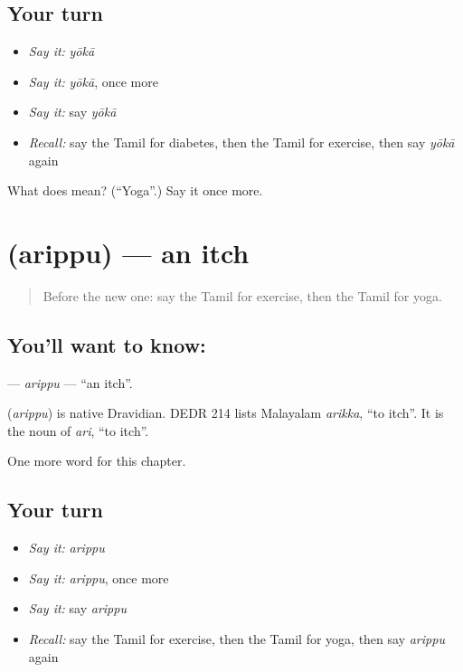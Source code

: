 \subsection*{Your turn}
\begin{itemize}
\raggedright
  \item \emph{Say it:} \emph{yōkā}
  \item \emph{Say it:} \emph{yōkā}, once more
  \item \emph{Say it:} say \emph{yōkā}
  \item \emph{Recall:} say the Tamil for diabetes, then the Tamil for exercise, then say \emph{yōkā} again
\end{itemize}

\begin{tcolorbox}[breakable,colback=teal!4,colframe=teal!35!black,title={Before you move on}]
What does  mean? (\textquotedblleft{}Yoga\textquotedblright{}.) Say it once more.
\end{tcolorbox}
\section[\texorpdfstring{\ta{அரிப்பு} (arippu)}{அரிப்பு (arippu)}]{ (arippu) — an itch}

\label{lesson:TA-C261-arippu}



\begin{quote}
Before the new one: say the Tamil for exercise, then the Tamil for yoga.
\end{quote}

\subsection*{You'll want to know: }
\textbf{} — \emph{arippu} — \textquotedblleft{}an itch\textquotedblright{}.

\begin{cousinweb}
\textbf{} (\emph{arippu}) is native Dravidian. DEDR 214 lists Malayalam \emph{arikka}, \textquotedblleft{}to itch\textquotedblright{}. It is the noun of \emph{ari}, \textquotedblleft{}to itch\textquotedblright{}.
\end{cousinweb}

\begin{grammarlens}[title={What you've built}]
One more word for this chapter.
\end{grammarlens}

\subsection*{Your turn}
\begin{itemize}
\raggedright
  \item \emph{Say it:} \emph{arippu}
  \item \emph{Say it:} \emph{arippu}, once more
  \item \emph{Say it:} say \emph{arippu}
  \item \emph{Recall:} say the Tamil for exercise, then the Tamil for yoga, then say \emph{arippu} again
\end{itemize}

